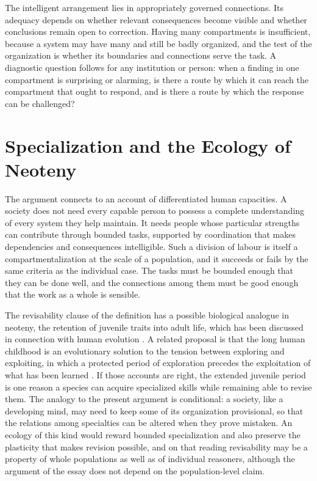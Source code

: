 \documentclass[12pt, a4paper]{article}
\begin{document}
The intelligent arrangement lies in appropriately governed connections. Its adequacy depends on whether relevant consequences become visible and whether conclusions remain open to correction. Having many compartments is insufficient, because a system may have many and still be badly organized, and the test of the organization is whether its boundaries and connections serve the task. A diagnostic question follows for any institution or person: when a finding in one compartment is surprising or alarming, is there a route by which it can reach the compartment that ought to respond, and is there a route by which the response can be challenged?

\section{Specialization and the Ecology of Neoteny}

The argument connects to an account of differentiated human capacities. A society does not need every capable person to possess a complete understanding of every system they help maintain. It needs people whose particular strengths can contribute through bounded tasks, supported by coordination that makes dependencies and consequences intelligible. Such a division of labour is itself a compartmentalization at the scale of a population, and it succeeds or fails by the same criteria as the individual case. The tasks must be bounded enough that they can be done well, and the connections among them must be good enough that the work as a whole is sensible.

The revisability clause of the definition has a possible biological analogue in neoteny, the retention of juvenile traits into adult life, which has been discussed in connection with human evolution \citep{gould1977}. A related proposal is that the long human childhood is an evolutionary solution to the tension between exploring and exploiting, in which a protected period of exploration precedes the exploitation of what has been learned \citep{gopnik2020}. If those accounts are right, the extended juvenile period is one reason a species can acquire specialized skills while remaining able to revise them. The analogy to the present argument is conditional: a society, like a developing mind, may need to keep some of its organization provisional, so that the relations among specialties can be altered when they prove mistaken. An ecology of this kind would reward bounded specialization and also preserve the plasticity that makes revision possible, and on that reading revisability may be a property of whole populations as well as of individual reasoners, although the argument of the essay does not depend on the population-level claim.
\end{document}
